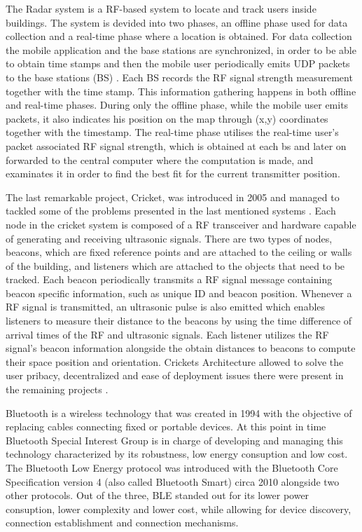 \documentclass[a4paper]{IEEEtran}
\begin{document}
The Radar system is a RF-based system to locate and track users inside buildings. The system is devided into two phases, an offline phase used for data collection and a real-time phase where a location is obtained. For data collection the mobile application and the base stations are synchronized, in order to be able to obtain time stamps and then the mobile user periodically emits UDP packets to the base stations (BS) . Each BS records the RF signal strength measurement together with the time stamp. This information gathering happens in both offline and real-time phases. During only the offline phase, while the mobile user emits packets, it also indicates his position on the map through (x,y) coordinates together with the timestamp. The real-time phase utilises the real-time user's packet associated RF signal strength, which is obtained at each bs and later on forwarded to the central computer where the computation is made, and examinates it in order to find the best fit for the current transmitter position.

The last remarkable project, Cricket, was introduced in 2005 and managed to tackled some of the problems presented in the last mentioned systems \cite{cricket1}. Each node in the cricket system is composed of a RF transceiver and hardware capable of generating and receiving ultrasonic signals. There are two types of nodes, beacons, which are fixed reference points and are attached to the ceiling or walls of the building, and listeners which are attached to the objects that need to be tracked. Each beacon periodically transmits a RF signal message containing beacon specific information, such as unique ID and beacon position. Whenever a RF signal is transmitted, an ultrasonic pulse is also emitted which enables listeners to measure their distance to the beacons by using the time difference of arrival times of the RF and ultrasonic signals. Each listener utilizes the RF signal's beacon information alongside the obtain distances to beacons to compute their space position and orientation. Crickets Architecture allowed to solve the user pribacy, decentralized and ease of deployment issues there were present in the remaining projects \cite{cricket}.



Bluetooth is a wireless technology that was created in 1994 with the objective of replacing cables connecting fixed or portable devices. At this point in time Bluetooth Special Interest Group is in charge of developing and managing this technology characterized by its robustness, low energy consuption and low cost. The Bluetooth Low Energy protocol was introduced with the Bluetooth Core Specification version 4 (also called Bluetooth Smart) circa 2010 alongside two other protocols.  Out of the three, BLE standed out for its lower power consuption, lower complexity and lower cost, while allowing for  device discovery, connection establishment and connection mechanisms. 
\end{document}
